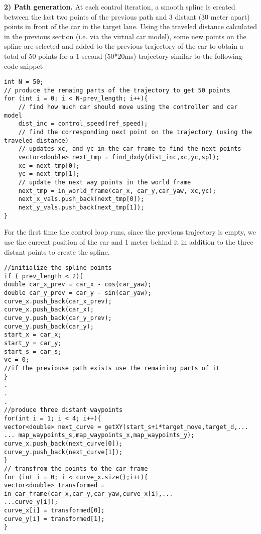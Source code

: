 \documentclass[12pt]{article}
\begin{document}
\textbf{ 2) Path generation.}
\newline
At each control iteration, a smooth spline is created between the last two points of the previous path and 3 distant (30 meter apart) points in front of the car in the target lane. Using the traveled distance calculated in the previous section (i.e. via the virtual car model), some new points on the spline are selected and added to the previous trajectory of the car to obtain a total of 50 points for a 1 second (50*20ms) trajectory similar to the following code snippet
\begin{verbatim}
int N = 50;
// produce the remaing parts of the trajectory to get 50 points
for (int i = 0; i < N-prev_length; i++){
	// find how much car should move using the controller and car model
	dist_inc = control_speed(ref_speed);
	// find the corresponding next point on the trajectory (using the traveled distance)
	// updates xc, and yc in the car frame to find the next points			
	vector<double> next_tmp = find_dxdy(dist_inc,xc,yc,spl);		
	xc = next_tmp[0];
	yc = next_tmp[1];
	// update the next way points in the world frame 
	next_tmp = in_world_frame(car_x, car_y,car_yaw, xc,yc);
	next_x_vals.push_back(next_tmp[0]);
	next_y_vals.push_back(next_tmp[1]);
}
\end{verbatim}

For the first time the control loop runs, since the previous trajectory is empty, we use the current position of the car and 1 meter behind it in addition to the three distant points to create the spline.

\begin{verbatim}
//initialize the spline points
if ( prev_length < 2){
double car_x_prev = car_x - cos(car_yaw);
double car_y_prev = car_y - sin(car_yaw);
curve_x.push_back(car_x_prev);
curve_x.push_back(car_x);	
curve_y.push_back(car_y_prev);
curve_y.push_back(car_y);	
start_x = car_x;
start_y = car_y;
start_s = car_s;
vc = 0;
//if the previouse path exists use the remaining parts of it
}
.
.
.
//produce three distant waypoints
for(int i = 1; i < 4; i++){
vector<double> next_curve = getXY(start_s+i*target_move,target_d,...
... map_waypoints_s,map_waypoints_x,map_waypoints_y);
curve_x.push_back(next_curve[0]);
curve_y.push_back(next_curve[1]);
}
// transfrom the points to the car frame 
for (int i = 0; i < curve_x.size();i++){
vector<double> transformed = in_car_frame(car_x,car_y,car_yaw,curve_x[i],...
...curve_y[i]);
curve_x[i] = transformed[0];
curve_y[i] = transformed[1];
}
\end{verbatim}
\end{document}
